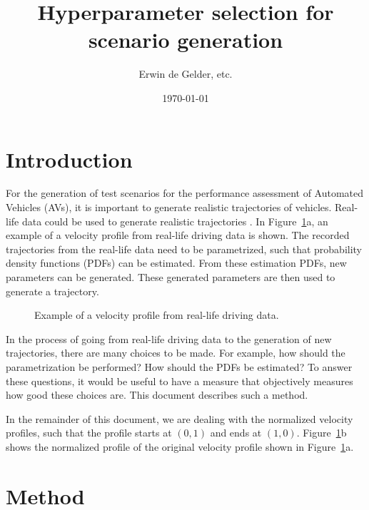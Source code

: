 \documentclass[10pt,final,a4paper,oneside,onecolumn]{article}
\def\reptitle{Hyperparameter selection for scenario generation}
\def\repauthor{Erwin de Gelder, etc.}
\newlength\figurewidth
\newlength\figureheight
\theoremstyle{plain}\newtheorem{definition}{Definition}[section]    %
\theoremstyle{definition}\newtheorem{example}{Example}[section]     %
\theoremstyle{remark}\newtheorem{remarkenv}{Remark}[section]        %
\begin{document}

\title{\textbf{\reptitle}}
\author{\repauthor}
\date{\today}
\maketitle

\tableofcontents

\newpage

\section{Introduction}

For the generation of test scenarios for the performance assessment of Automated Vehicles (AVs), it is important to generate realistic trajectories of vehicles. Real-life data could be used to generate realistic trajectories \cite{deGelder2017assessment}. In Figure~\ref{fig:velocity example}a, an example of a velocity profile from real-life driving data is shown. The recorded trajectories from the real-life data need to be parametrized, such that probability density functions (PDFs) can be estimated. From these estimation PDFs, new parameters can be generated. These generated parameters are then used to generate a trajectory. 

\begin{figure}[b]
	\centering
	\setlength\figureheight{150pt}
	\setlength{}
	\subfloat[Original]{}
	\subfloat[Normalized]{}
	\caption{Example of a velocity profile from real-life driving data.}
	\label{fig:velocity example}
\end{figure}

In the process of going from real-life driving data to the generation of new trajectories, there are many choices to be made. For example, how should the parametrization be performed? How should the PDFs be estimated? To answer these questions, it would be useful to have a measure that objectively measures how good these choices are. This document describes such a method.

In the remainder of this document, we are dealing with the normalized velocity profiles, such that the profile starts at $(0,1)$ and ends at $(1,0)$. Figure~\ref{fig:velocity example}b shows the normalized profile of the original velocity profile shown in Figure~\ref{fig:velocity example}a.

\section{Method}
\label{sec:method}
\end{document}
